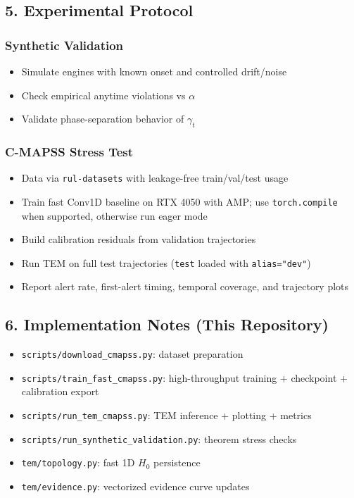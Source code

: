 \documentclass[
]{article}
\providecommand{\tightlist}{%
  \setlength{\itemsep}{0pt}\setlength{\parskip}{0pt}}
\begin{document}
\subsection{5. Experimental Protocol}\label{experimental-protocol}

\subsubsection{Synthetic Validation}\label{synthetic-validation}

\begin{itemize}
\tightlist
\item
  Simulate engines with known onset and controlled drift/noise
\item
  Check empirical anytime violations vs \(\alpha\)
\item
  Validate phase-separation behavior of \(\gamma_t\)
\end{itemize}

\subsubsection{C-MAPSS Stress Test}\label{c-mapss-stress-test}

\begin{itemize}
\tightlist
\item
  Data via \texttt{rul-datasets} with leakage-free train/val/test usage
\item
  Train fast Conv1D baseline on RTX 4050 with AMP; use
  \texttt{torch.compile} when supported, otherwise run eager mode
\item
  Build calibration residuals from validation trajectories
\item
  Run TEM on full test trajectories (\texttt{test} loaded with
  \texttt{alias="dev"})
\item
  Report alert rate, first-alert timing, temporal coverage, and
  trajectory plots
\end{itemize}

\subsection{6. Implementation Notes (This
Repository)}\label{implementation-notes-this-repository}

\begin{itemize}
\tightlist
\item
  \texttt{scripts/download\_cmapss.py}: dataset preparation
\item
  \texttt{scripts/train\_fast\_cmapss.py}: high-throughput training +
  checkpoint + calibration export
\item
  \texttt{scripts/run\_tem\_cmapss.py}: TEM inference + plotting +
  metrics
\item
  \texttt{scripts/run\_synthetic\_validation.py}: theorem stress checks
\item
  \texttt{tem/topology.py}: fast 1D \(H_0\) persistence
\item
  \texttt{tem/evidence.py}: vectorized evidence curve updates
\end{itemize}
\end{document}
